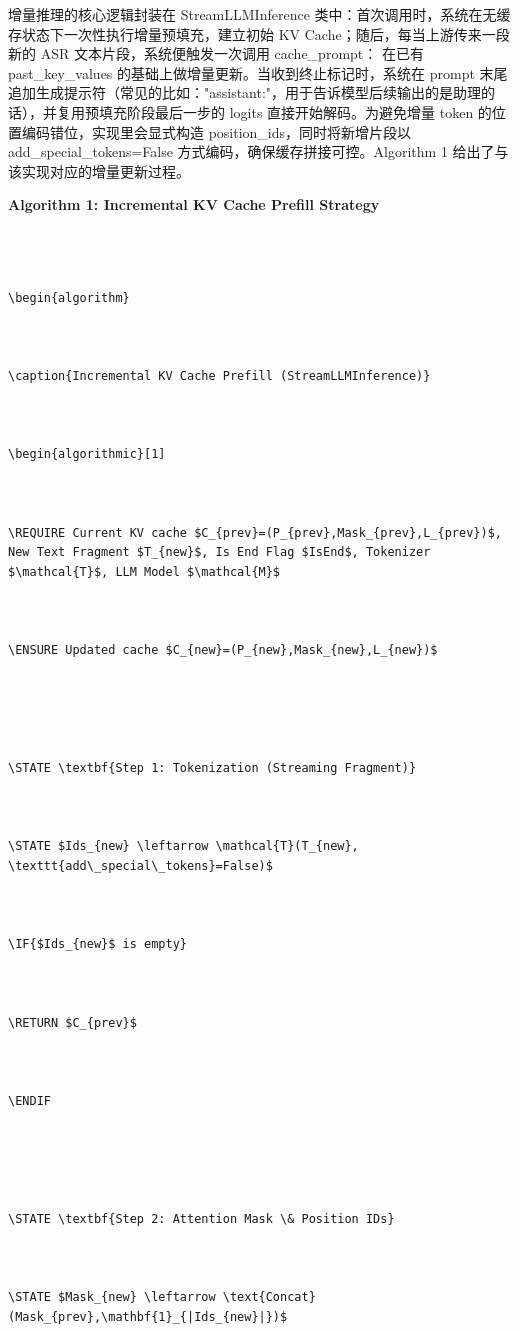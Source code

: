 \documentclass[UTF8,a4paper,12pt]{ctexart}
\begin{document}
增量推理的核心逻辑封装在 StreamLLMInference 类中：首次调用时，系统在无缓存状态下一次性执行增量预填充，建立初始 KV Cache；随后，每当上游传来一段新的 ASR 文本片段，系统便触发一次调用 cache\_prompt： 在已有 past\_key\_values 的基础上做增量更新。当收到终止标记时，系统在 prompt 末尾追加生成提示符（常见的比如："assistant:"，用于告诉模型后续输出的是助理的话），并复用预填充阶段最后一步的 logits 直接开始解码。为避免增量 token 的位置编码错位，实现里会显式构造 position\_ids，同时将新增片段以 add\_special\_tokens=False 方式编码，确保缓存拼接可控。Algorithm 1 给出了与该实现对应的增量更新过程。

\textbf{Algorithm 1: Incremental KV Cache Prefill Strategy}


\begin{Verbatim}[breaklines=true,breakanywhere=true]

  

\begin{algorithm}

  

\caption{Incremental KV Cache Prefill (StreamLLMInference)}

  

\begin{algorithmic}[1]

  

\REQUIRE Current KV cache $C_{prev}=(P_{prev},Mask_{prev},L_{prev})$, New Text Fragment $T_{new}$, Is End Flag $IsEnd$, Tokenizer $\mathcal{T}$, LLM Model $\mathcal{M}$

  

\ENSURE Updated cache $C_{new}=(P_{new},Mask_{new},L_{new})$

  

  

\STATE \textbf{Step 1: Tokenization (Streaming Fragment)}

  

\STATE $Ids_{new} \leftarrow \mathcal{T}(T_{new}, \texttt{add\_special\_tokens}=False)$

  

\IF{$Ids_{new}$ is empty}

  

\RETURN $C_{prev}$

  

\ENDIF

  

  

\STATE \textbf{Step 2: Attention Mask \& Position IDs}

  

\STATE $Mask_{new} \leftarrow \text{Concat}(Mask_{prev},\mathbf{1}_{|Ids_{new}|})$


\end{Verbatim}
\end{document}
